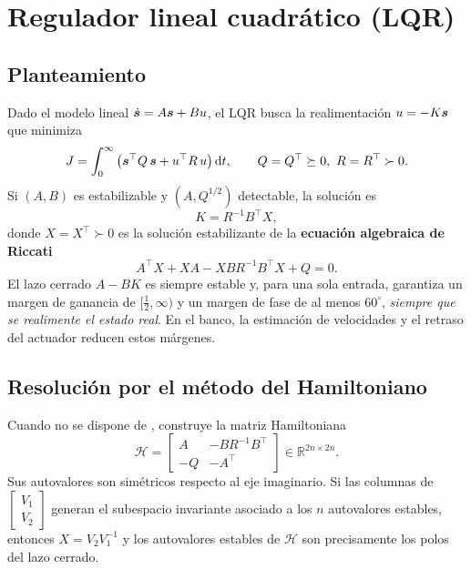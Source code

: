 \section{Regulador lineal cuadrático (LQR)}
\label{sec:lqr}

\subsection{Planteamiento}

Dado el modelo lineal $\dot{\bm{s}}=A\bm{s}+Bu$, el LQR busca la realimentación $u=-K\bm{s}$ que minimiza
\begin{equation}
J = \int_0^\infty \left(\bm{s}^\top Q\,\bm{s} + u^\top R\,u\right)\mathrm{d} t,\qquad Q=Q^\top\succeq0,\ R=R^\top\succ0 .
\end{equation}
Si $(A,B)$ es estabilizable y $(A,Q^{1/2})$ detectable, la solución es
\begin{equation}
K = R^{-1}B^\top X,
\end{equation}
donde $X=X^\top\succ0$ es la solución estabilizante de la \textbf{ecuación algebraica de Riccati}
\begin{equation}
A^\top X + XA - XBR^{-1}B^\top X + Q = 0 .
\label{eq:are}
\end{equation}
El lazo cerrado $A-BK$ es siempre estable y, para una sola entrada, garantiza un margen de ganancia de $[\tfrac12,\infty)$ y un margen de fase de al menos $60^\circ$, \emph{siempre que se realimente el estado real}. En el banco, la estimación de velocidades y el retraso del actuador reducen estos márgenes.

\subsection{Resolución por el método del Hamiltoniano}
\label{sec:hamiltoniano}

Cuando no se dispone de ,  construye la matriz Hamiltoniana
\begin{equation}
\mathcal H=\begin{bmatrix} A & -BR^{-1}B^\top\\ -Q & -A^\top\end{bmatrix}\in\mathbb R^{2n\times 2n}.
\end{equation}
Sus autovalores son simétricos respecto al eje imaginario. Si las columnas de $\left[\begin{smallmatrix}V_1\\V_2\end{smallmatrix}\right]$ generan el subespacio invariante asociado a los $n$ autovalores estables, entonces $X=V_2V_1^{-1}$ y los autovalores estables de $\mathcal H$ son precisamente los polos del lazo cerrado.

